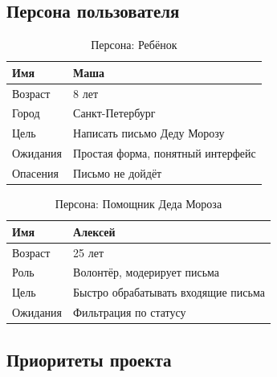 \documentclass[14pt,a4paper]{extarticle}
\begin{document}
\subsection{Персона пользователя}

\begin{table}[H]
\centering
\caption{Персона: Ребёнок}
\label{tab:persona_child}
\small
\begin{tabular}{|L{3.5cm}|L{9cm}|}
\hline
Имя & Маша \\
\hline
Возраст & 8 лет \\
\hline
Город & Санкт-Петербург \\
\hline
Цель & Написать письмо Деду Морозу \\
\hline
Ожидания & Простая форма, понятный интерфейс \\
\hline
Опасения & Письмо не дойдёт \\
\hline
\end{tabular}
\end{table}

\begin{table}[H]
\centering
\caption{Персона: Помощник Деда Мороза}
\label{tab:persona_helper}
\small
\begin{tabular}{|L{3.5cm}|L{9cm}|}
\hline
Имя & Алексей \\
\hline
Возраст & 25 лет \\
\hline
Роль & Волонтёр, модерирует письма \\
\hline
Цель & Быстро обрабатывать входящие письма \\
\hline
Ожидания & Фильтрация по статусу \\
\hline
\end{tabular}
\end{table}

\subsection{Приоритеты проекта}

\begin{table}[H]
\centering
\caption{Приоритеты функциональности}
\label{tab:priorities}
\small
{}
\end{table}
\end{document}
